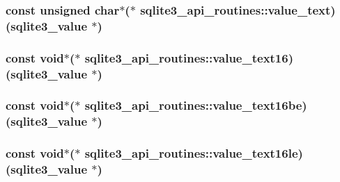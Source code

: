 \hypertarget{structsqlite3__api__routines_abb9daaa43ca3ddb2c9bad4991f9a327c}{
\subsubsection[{value\-\_\-text}]{\setlength{\rightskip}{0pt plus 5cm}const unsigned char$\ast$($\ast$ sqlite3\-\_\-api\-\_\-routines\-::value\-\_\-text)({\bf sqlite3\-\_\-value} $\ast$)}}\label{structsqlite3__api__routines_abb9daaa43ca3ddb2c9bad4991f9a327c}
\hypertarget{structsqlite3__api__routines_a2a4f433b82df50bbb9178b33f851237a}{
\subsubsection[{value\-\_\-text16}]{\setlength{\rightskip}{0pt plus 5cm}const void$\ast$($\ast$ sqlite3\-\_\-api\-\_\-routines\-::value\-\_\-text16)({\bf sqlite3\-\_\-value} $\ast$)}}\label{structsqlite3__api__routines_a2a4f433b82df50bbb9178b33f851237a}
\hypertarget{structsqlite3__api__routines_abdb7dd82bf4147ac140df3f4d36a1c20}{
\subsubsection[{value\-\_\-text16be}]{\setlength{\rightskip}{0pt plus 5cm}const void$\ast$($\ast$ sqlite3\-\_\-api\-\_\-routines\-::value\-\_\-text16be)({\bf sqlite3\-\_\-value} $\ast$)}}\label{structsqlite3__api__routines_abdb7dd82bf4147ac140df3f4d36a1c20}
\hypertarget{structsqlite3__api__routines_aa3a4150e9ecc70a364f09ae446ccab7d}{
\subsubsection[{value\-\_\-text16le}]{\setlength{\rightskip}{0pt plus 5cm}const void$\ast$($\ast$ sqlite3\-\_\-api\-\_\-routines\-::value\-\_\-text16le)({\bf sqlite3\-\_\-value} $\ast$)}}\label{structsqlite3__api__routines_aa3a4150e9ecc70a364f09ae446ccab7d}
